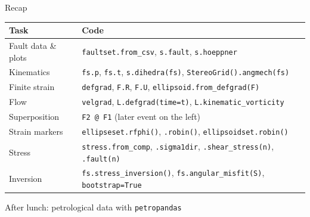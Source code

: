 \documentclass[aspectratio=169,11pt]{beamer}
\begin{document}
\begin{frame}{Recap}
  \centering
  \small
  \begin{tabular}{ll}
    \toprule
    \textbf{Task} & \textbf{Code} \\
    \midrule
    Fault data \& plots & \texttt{faultset.from\_csv}, \texttt{s.fault}, \texttt{s.hoeppner} \\
    Kinematics & \texttt{fs.p}, \texttt{fs.t}, \texttt{s.dihedra(fs)}, \texttt{StereoGrid().angmech(fs)} \\
    Finite strain & \texttt{defgrad}, \texttt{F.R}, \texttt{F.U}, \texttt{ellipsoid.from\_defgrad(F)} \\
    Flow & \texttt{velgrad}, \texttt{L.defgrad(time=t)}, \texttt{L.kinematic\_vorticity} \\
    Superposition & \texttt{F2 @ F1} (later event on the left) \\
    Strain markers & \texttt{ellipseset.rfphi()}, \texttt{.robin()}, \texttt{ellipsoidset.robin()} \\
    Stress & \texttt{stress.from\_comp}, \texttt{.sigma1dir}, \texttt{.shear\_stress(n)}, \texttt{.fault(n)} \\
    Inversion & \texttt{fs.stress\_inversion()}, \texttt{fs.angular\_misfit(S)}, \texttt{bootstrap=True} \\
    \bottomrule
  \end{tabular}

  \vspace{0.5cm}
  \Large After lunch: petrological data with \texttt{petropandas}
\end{frame}
\end{document}

